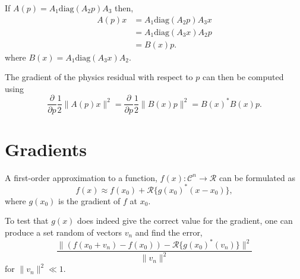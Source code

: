 \documentclass{article}
\newcommand{\be}{\begin{equation}}
\newcommand{\ee}{\end{equation}}
\newcommand{\inv}{\frac{1}}
\newcommand{\del}{\partial}
\newcommand{\der}[1]{\frac{\del}{\del #1}}
\newcommand{\diag}{\text{diag}}
\begin{document}
If $A(p) = A_1 \diag(A_2 p) A_3$ then,
\begin{align}
    A(p)x &= A_1 \diag(A_2 p) A_3 x \\
        &= A_1 \diag(A_3 x) A_2 p \\
        &= B(x) p. 
\end{align}
where $B(x) = A_1 \diag(A_3 x) A_2$.

The gradient of the physics residual with respect to $p$ can then be computed using
\be \der{p} \inv{2} \|A(p)x\|^2 = \der{p} \inv{2} \|B(x)p\|^2 = B(x)^*B(x)p. \ee

\section{Gradients}
A first-order approximation to a function, $f(x): \mathcal{C}^{n} \to \mathcal{R}$ can be formulated as
\be f(x) \approx f(x_0) + \mathcal{R}\{g(x_0)^\ast (x - x_0)\}, \ee
where $g(x_0)$ is the gradient of $f$ at $x_0$.

To test that $g(x)$ does indeed give the correct value for the gradient, one can produce a set random of vectors $v_n$ and find the error, 
\be \frac{\| (f(x_0+v_n) - f(x_0)) - \mathcal{R}\{g(x_0)^\ast (v_n)\} \|^2}
	{\| v_n \|^2} \ee
for $\|v_n\|^2 \ll 1 $.
	

\begin{thebibliography}{99}
\end{thebibliography}
\end{document}
